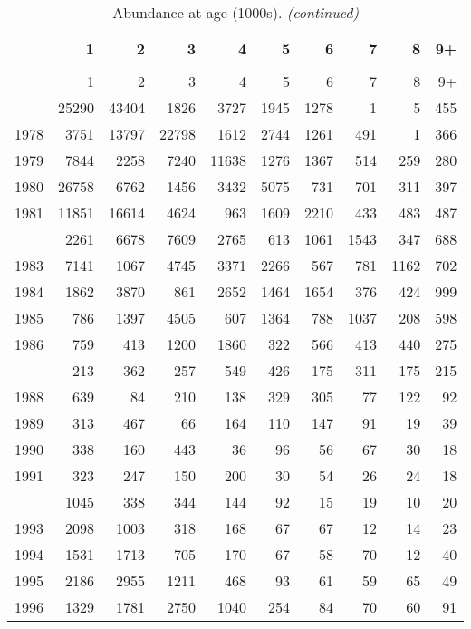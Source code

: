 \documentclass[
]{article}
\begin{document}
\begin{longtable}[t]{lrrrrrrrrr}
\caption{\label{tab:NAA-table}Abundance at age (1000s).}\\
\toprule
  & 1 & 2 & 3 & 4 & 5 & 6 & 7 & 8 & 9+\\
\midrule
\endfirsthead
\caption[]{Abundance at age (1000s). \textit{(continued)}}\\
\toprule
  & 1 & 2 & 3 & 4 & 5 & 6 & 7 & 8 & 9+\\
\midrule
\endhead

\endfoot
\bottomrule
\endlastfoot
1977 & 25290 & 43404 & 1826 & 3727 & 1945 & 1278 & 1 & 5 & 455\\
1978 & 3751 & 13797 & 22798 & 1612 & 2744 & 1261 & 491 & 1 & 366\\
1979 & 7844 & 2258 & 7240 & 11638 & 1276 & 1367 & 514 & 259 & 280\\
1980 & 26758 & 6762 & 1456 & 3432 & 5075 & 731 & 701 & 311 & 397\\
1981 & 11851 & 16614 & 4624 & 963 & 1609 & 2210 & 433 & 483 & 487\\
\addlinespace
1982 & 2261 & 6678 & 7609 & 2765 & 613 & 1061 & 1543 & 347 & 688\\
1983 & 7141 & 1067 & 4745 & 3371 & 2266 & 567 & 781 & 1162 & 702\\
1984 & 1862 & 3870 & 861 & 2652 & 1464 & 1654 & 376 & 424 & 999\\
1985 & 786 & 1397 & 4505 & 607 & 1364 & 788 & 1037 & 208 & 598\\
1986 & 759 & 413 & 1200 & 1860 & 322 & 566 & 413 & 440 & 275\\
\addlinespace
1987 & 213 & 362 & 257 & 549 & 426 & 175 & 311 & 175 & 215\\
1988 & 639 & 84 & 210 & 138 & 329 & 305 & 77 & 122 & 92\\
1989 & 313 & 467 & 66 & 164 & 110 & 147 & 91 & 19 & 39\\
1990 & 338 & 160 & 443 & 36 & 96 & 56 & 67 & 30 & 18\\
1991 & 323 & 247 & 150 & 200 & 30 & 54 & 26 & 24 & 18\\
\addlinespace
1992 & 1045 & 338 & 344 & 144 & 92 & 15 & 19 & 10 & 20\\
1993 & 2098 & 1003 & 318 & 168 & 67 & 67 & 12 & 14 & 23\\
1994 & 1531 & 1713 & 705 & 170 & 67 & 58 & 70 & 12 & 40\\
1995 & 2186 & 2955 & 1211 & 468 & 93 & 61 & 59 & 65 & 49\\
1996 & 1329 & 1781 & 2750 & 1040 & 254 & 84 & 70 & 60 & 91\\

\end{longtable}
\end{document}

